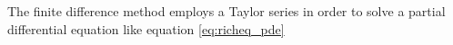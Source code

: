 The finite difference method employs a Taylor series in order to solve a partial differential equation like equation \eqref{eq:richeq_pde} 



